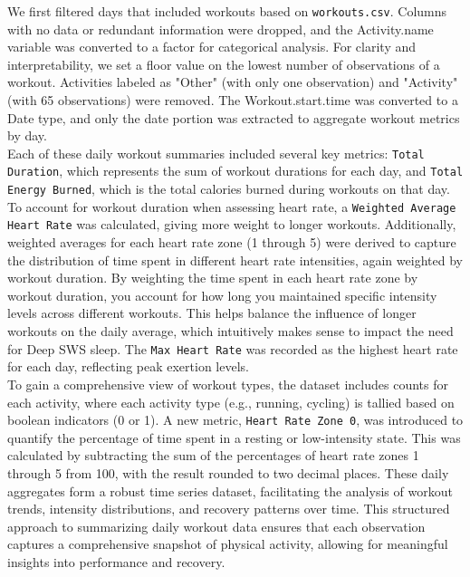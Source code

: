 \documentclass{article}
\begin{document}
We first filtered days that included workouts based on \texttt{workouts.csv}. Columns with no data or redundant information were dropped, and the Activity.name variable was converted to a factor for categorical analysis. For clarity and interpretability, we set a floor value on the lowest number of observations of a workout. Activities labeled as "Other" (with only one observation) and "Activity" (with 65 observations) were removed. The Workout.start.time was converted to a Date type, and only the date portion was extracted to aggregate workout metrics by day. \\

Each of these daily workout summaries included several key metrics: \texttt{Total Duration}, which represents the sum of workout durations for each day, and \texttt{Total Energy Burned}, which is the total calories burned during workouts on that day. To account for workout duration when assessing heart rate, a \texttt{Weighted Average Heart Rate} was calculated, giving more weight to longer workouts. Additionally, weighted averages for each heart rate zone (1 through 5) were derived to capture the distribution of time spent in different heart rate intensities, again weighted by workout duration. By weighting the time spent in each heart rate zone by workout duration, you account for how long you maintained specific intensity levels across different workouts. This helps balance the influence of longer workouts on the daily average, which intuitively makes sense to impact the need for Deep  SWS sleep. The \texttt{Max Heart Rate} was recorded as the highest heart rate for each day, reflecting peak exertion levels. \\

To gain a comprehensive view of workout types, the dataset includes counts for each activity, where each activity type (e.g., running, cycling) is tallied based on boolean indicators (0 or 1). A new metric, \texttt{Heart Rate Zone 0}, was introduced to quantify the percentage of time spent in a resting or low-intensity state. This was calculated by subtracting the sum of the percentages of heart rate zones 1 through 5 from 100, with the result rounded to two decimal places. These daily aggregates form a robust time series dataset, facilitating the analysis of workout trends, intensity distributions, and recovery patterns over time. This structured approach to summarizing daily workout data ensures that each observation captures a comprehensive snapshot of physical activity, allowing for meaningful insights into performance and recovery. \\
\end{document}
